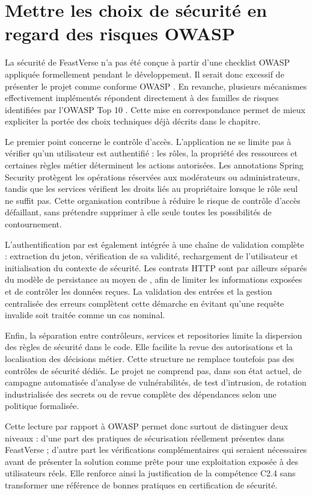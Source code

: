 \section{Mettre les choix de sécurité en regard des risques OWASP}

La sécurité de FeastVerse n'a pas été conçue à partir d'une checklist OWASP appliquée formellement pendant le développement. Il serait donc excessif de présenter le projet comme \og conforme OWASP \fg{}. En revanche, plusieurs mécanismes effectivement implémentés répondent directement à des familles de risques identifiées par l'OWASP Top 10 \parencite{owasp-top10}. Cette mise en correspondance permet de mieux expliciter la portée des choix techniques déjà décrits dans le chapitre.

Le premier point concerne le contrôle d'accès. L'application ne se limite pas à vérifier qu'un utilisateur est authentifié : les rôles, la propriété des ressources et certaines règles métier déterminent les actions autorisées. Les annotations Spring Security protègent les opérations réservées aux modérateurs ou administrateurs, tandis que les services vérifient les droits liés au propriétaire lorsque le rôle seul ne suffit pas. Cette organisation contribue à réduire le risque de contrôle d'accès défaillant, sans prétendre supprimer à elle seule toutes les possibilités de contournement.

L'authentification par  est également intégrée à une chaîne de validation complète : extraction du jeton, vérification de sa validité, rechargement de l'utilisateur et initialisation du contexte de sécurité. Les contrats HTTP sont par ailleurs séparés du modèle de persistance au moyen de , afin de limiter les informations exposées et de contrôler les données reçues. La validation des entrées et la gestion centralisée des erreurs complètent cette démarche en évitant qu'une requête invalide soit traitée comme un cas nominal.

Enfin, la séparation entre contrôleurs, services et repositories limite la dispersion des règles de sécurité dans le code. Elle facilite la revue des autorisations et la localisation des décisions métier. Cette structure ne remplace toutefois pas des contrôles de sécurité dédiés. Le projet ne comprend pas, dans son état actuel, de campagne automatisée d'analyse de vulnérabilités, de test d'intrusion, de rotation industrialisée des secrets ou de revue complète des dépendances selon une politique formalisée.

Cette lecture par rapport à OWASP permet donc surtout de distinguer deux niveaux : d'une part des pratiques de sécurisation réellement présentes dans FeastVerse ; d'autre part les vérifications complémentaires qui seraient nécessaires avant de présenter la solution comme prête pour une exploitation exposée à des utilisateurs réels. Elle renforce ainsi la justification de la compétence C2.4 sans transformer une référence de bonnes pratiques en certification de sécurité.